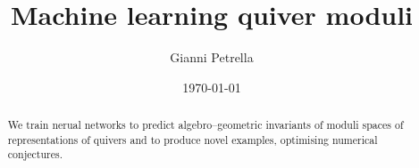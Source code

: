 \documentclass[11pt, a4paper]{article}
\title{Machine learning quiver moduli}
\author{Gianni Petrella}
\date{\today}
\begin{document}
\maketitle
{}

\begin{abstract}
	We train nerual networks to predict algebro--geometric invariants
	of moduli spaces of representations of quivers and to produce
	novel examples, optimising numerical conjectures.
\end{abstract}

\end{document}
